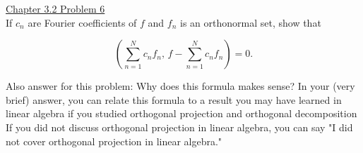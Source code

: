\documentclass[11pt]{article}
\begin{document}
\underline{Chapter 3.2 Problem 6} \\

If $c_n$ are Fourier coefficients of $f$ and $f_n$ is an orthonormal set, show that

\[ \left(\sum\limits_{n=1}^N c_n f_n, \, f  - \sum\limits_{n=1}^N c_nf_n \right) = 0.\]

Also answer for this problem: Why does this formula makes sense?
In your (very brief) answer, you can relate this formula to a result you may have learned
in linear algebra if you studied orthogonal projection and orthogonal decomposition
If you did not discuss orthogonal projection in linear algebra, you can say "I did not
cover orthogonal projection in linear algebra."
\end{document}
